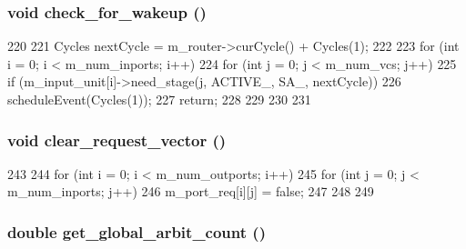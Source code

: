 \hypertarget{classSWallocator__d_a3312235aad1a35d2eb8dfe6b3a93d880}{
\subsubsection[{check\_\-for\_\-wakeup}]{\setlength{\rightskip}{0pt plus 5cm}void check\_\-for\_\-wakeup ()}}
\label{classSWallocator__d_a3312235aad1a35d2eb8dfe6b3a93d880}



\begin{DoxyCode}
220 {
221     Cycles nextCycle = m_router->curCycle() + Cycles(1);
222 
223     for (int i = 0; i < m_num_inports; i++) {
224         for (int j = 0; j < m_num_vcs; j++) {
225             if (m_input_unit[i]->need_stage(j, ACTIVE_, SA_, nextCycle)) {
226                 scheduleEvent(Cycles(1));
227                 return;
228             }
229         }
230     }
231 }
\end{DoxyCode}
\hypertarget{classSWallocator__d_ac8b7aea8034854f208223b1c36fe1b68}{
\subsubsection[{clear\_\-request\_\-vector}]{\setlength{\rightskip}{0pt plus 5cm}void clear\_\-request\_\-vector ()}}
\label{classSWallocator__d_ac8b7aea8034854f208223b1c36fe1b68}



\begin{DoxyCode}
243 {
244     for (int i = 0; i < m_num_outports; i++) {
245         for (int j = 0; j < m_num_inports; j++) {
246             m_port_req[i][j] = false;
247         }
248     }
249 }
\end{DoxyCode}
\hypertarget{classSWallocator__d_aac435b881c9b265abadc8989c48dab3f}{
\subsubsection[{get\_\-global\_\-arbit\_\-count}]{\setlength{\rightskip}{0pt plus 5cm}double get\_\-global\_\-arbit\_\-count ()}}
\label{classSWallocator__d_aac435b881c9b265abadc8989c48dab3f}



